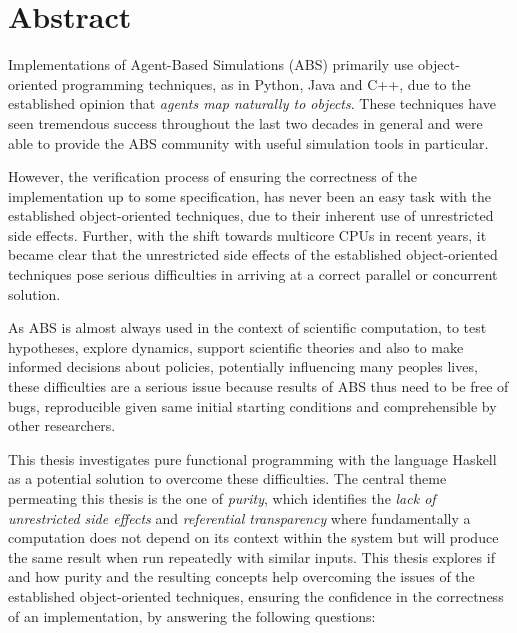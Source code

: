 \section*{Abstract}
Implementations of Agent-Based Simulations (ABS) primarily use object- \\ oriented programming techniques, as in Python, Java and C++, due to the established opinion that \textit{agents map naturally to objects}. These techniques have seen tremendous success throughout the last two decades in general and were able to provide the ABS community with useful simulation tools in particular.

However, the verification process of ensuring the correctness of the implementation up to some specification, has never been an easy task with the established object-oriented techniques, due to their inherent use of unrestricted side effects.
Further, with the shift towards multicore CPUs in recent years, it became clear that the unrestricted side effects of the established object-oriented techniques pose serious difficulties in arriving at a correct parallel or concurrent solution. %

As ABS is almost always used in the context of scientific computation, to test hypotheses, explore dynamics, support scientific theories and also to make informed decisions about policies, potentially influencing many peoples lives, these difficulties are a serious issue because results of ABS thus need to be free of bugs, reproducible given same initial starting conditions and comprehensible by other researchers.

\medskip

This thesis investigates pure functional programming with the language Haskell as a potential solution to overcome these difficulties. The central theme permeating this thesis is the one of \textit{purity}, which identifies the \textit{lack of unrestricted side effects} and \textit{referential transparency} where fundamentally a computation does not depend on its context within the system but will produce the same result when run repeatedly with similar inputs. This thesis explores if and how purity and the resulting concepts help overcoming the issues of the established object-oriented techniques, ensuring the confidence in the correctness of an implementation, by answering the following questions:


